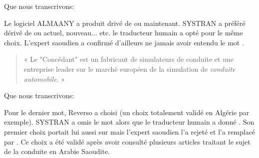 \documentclass[french]{textolivre}
\begin{document}
Que nous transcrivons:

\begin{quote}
\end{quote}

Le logiciel ALMAANY a produit  drivé de  ou maintenant. SYSTRAN   a préféré  dérivé de  ou actuel, nouveau... etc. le traducteur humain a opté pour le même choix. L’expert saoudien a confirmé d’ailleurs ne jamais avoir entendu le mot .

\begin{quote}
« Le "Concédant" est un fabricant de simulateurs de conduite et une entreprise leader sur le marché européen de la simulation de \emph{conduite automobile}. »
\end{quote}

\begin{quote}
\end{quote}

Que nous transcrivons:

\begin{quote}
\end{quote}

Pour le dernier mot, Reverso a choisi  (un choix totalement validé en Algérie par exemple). SYSTRAN a omis le mot alors que le traducteur humain a donné . Son premier choix portait lui aussi  sur  mais l’expert saoudien l’a rejeté et l’a remplacé par . Ce choix a été validé après avoir consulté plusieurs articles traitant le sujet de la conduite en Arabie Saoudite.
\end{document}
